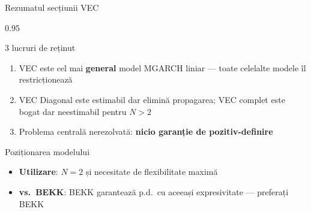 \documentclass[9pt, aspectratio=169, t]{beamer}
\begin{document}
\begin{frame}{Rezumatul secțiunii VEC}
    \begin{cminipage}{0.95\textwidth}
    {\footnotesize
    \begin{block}{3 lucruri de reținut}
        \begin{enumerate}\setlength{\itemsep}{2pt}
            \item VEC este cel mai \textbf{general} model MGARCH liniar --- toate celelalte modele îl restricționează
            \item VEC Diagonal este estimabil dar elimină propagarea; VEC complet este bogat dar neestimabil pentru $N > 2$
            \item Problema centrală nerezolvată: \textbf{nicio garanție de pozitiv-definire}
        \end{enumerate}
    \end{block}
    \begin{alertblock}{Poziționarea modelului}
        \begin{itemize}\setlength{\itemsep}{0pt}
            \item \textbf{Utilizare}: $N = 2$ și necesitate de flexibilitate maximă
            \item \textbf{vs.\ BEKK}: BEKK garantează p.d.\ cu aceeași expresivitate --- preferați BEKK
        \end{itemize}
    \end{alertblock}
    }
    \end{cminipage}
\end{frame}

\end{document}
